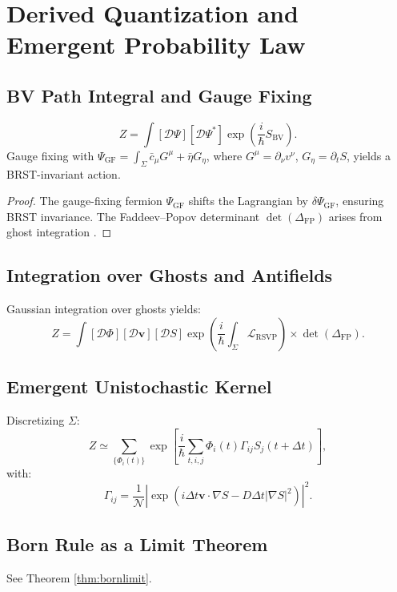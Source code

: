 \documentclass[12pt]{article}
\begin{document}
\section{Derived Quantization and Emergent Probability Law}
\label{app:quantization}

\subsection{BV Path Integral and Gauge Fixing}

\[
Z = \int [\mathcal{D}\Psi][\mathcal{D}\Psi^*] \exp\left( \frac{i}{\hbar} S_{\mathrm{BV}} \right).
\]
Gauge fixing with \(\Psi_{\mathrm{GF}} = \int_\Sigma \bar{c}_\mu G^\mu + \bar{\eta} G_\eta\), where \(G^\mu = \partial_\nu v^\nu\), \(G_\eta = \partial_t S\), yields a BRST-invariant action.

\begin{proof}
The gauge-fixing fermion \(\Psi_{\mathrm{GF}}\) shifts the Lagrangian by \(\delta \Psi_{\mathrm{GF}}\), ensuring BRST invariance. The Faddeev–Popov determinant \(\det(\Delta_{\mathrm{FP}})\) arises from ghost integration \citep{Ikeda1994}.
\end{proof}

\subsection{Integration over Ghosts and Antifields}

Gaussian integration over ghosts yields:
\[
Z = \int [\mathcal{D}\Phi][\mathcal{D}\mathbf{v}][\mathcal{D}S] \exp\left( \frac{i}{\hbar} \int_\Sigma \mathcal{L}_{\mathrm{RSVP}} \right) \times \det(\Delta_{\mathrm{FP}}).
\]

\subsection{Emergent Unistochastic Kernel}

Discretizing \(\Sigma\):
\[
Z \simeq \sum_{\{\Phi_i(t)\}} \exp\left[ \frac{i}{\hbar} \sum_{t,i,j} \Phi_i(t) \Gamma_{ij} S_j(t + \Delta t) \right],
\]
with:
\[
\Gamma_{ij} = \frac{1}{\mathcal{N}} \left| \exp\left( i \Delta t \mathbf{v} \cdot \nabla S - D \Delta t |\nabla S|^2 \right) \right|^2.
\]

\subsection{Born Rule as a Limit Theorem}

See Theorem \ref{thm:bornlimit}.
\end{document}
